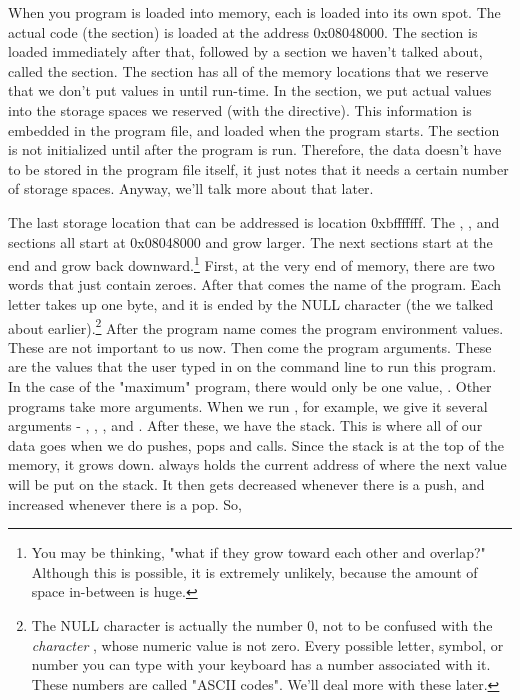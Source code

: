 When you program is loaded into memory, each 
is loaded into its own spot.  The actual code (the 
section) is loaded at the address 0x08048000.  The 
section is loaded immediately after that, followed by a section we
haven't talked about, called the  
section.  The  section has all of the memory
locations that we reserve that we don't put values in until run-time.
In the  section, we put actual values into
the storage spaces we reserved (with the  
directive).  This information is embedded in the program file, and
loaded when the program starts.  The  section
is not initialized until after the program is run.  Therefore, the
data doesn't have to be stored in the program file itself, it just
notes that it needs a certain number of storage spaces.  Anyway,
we'll talk more about that later.

The last storage location that can be addressed is location
0xbfffffff.  The , ,
and  sections all start at 0x08048000 and
grow larger.  The next sections start at the end and grow back
downward.\footnote{You may be thinking, "what if they grow
toward each other and overlap?"  Although this is possible, it
is extremely unlikely, because the amount of space in-between is
huge.}  First, at the very end of memory,
there are  two words that
just contain zeroes.  After that comes the name of the program.
Each letter takes up one byte, and it is ended by
the NULL character (the  we talked about
earlier).\footnote{The NULL character is actually the 
number 0, not to be confused with the \emph{character}
, whose numeric value is not zero.  Every
possible letter, symbol, or number you can type with your keyboard
has a number associated with it.  These numbers are called
"ASCII codes".  We'll deal more with these later.}
After the program name comes the program environment values.  These
are not important to us now.  Then come the program arguments.
These are the values that the user typed in on the command line
to run this program.  In the case of the "maximum" program, there
would only be one value, .  Other
programs take more arguments.  When we run ,
for example, we give it several arguments - ,
, , and 
.  After these, we have the stack.
This is where all of our data goes when we do pushes, pops and
calls.  Since the stack is at the top of the memory, it grows
down.  \icode{{\espBare}} always holds the current address
of where the next value will be put on the stack.  It then gets
decreased whenever there is a push, and increased whenever there
is a pop.  So,

